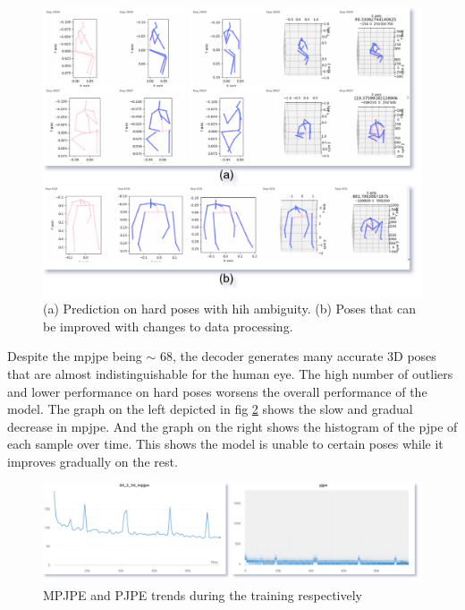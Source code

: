 \begin{figure}[h]
    \centering
    \includegraphics[scale=0.2]{figures/results/bad_samples.png}
    \caption{(a) Prediction on hard poses with hih ambiguity. (b) Poses that can be improved with changes to data processing.}
    \label{fig:bad_samples}
\end{figure}

Despite the \ac{mpjpe} being $\sim$ 68, the decoder generates many accurate 3D poses that are almost indistinguishable for the human eye. The high number of outliers and lower performance on hard poses worsens the overall performance of the model. The graph on the left depicted in fig \ref{fig:mpjpe_trends} shows the slow and gradual decrease in \ac{mpjpe}. And the graph on the right shows the histogram of the \ac{pjpe} of each sample over time. This shows the model is unable to certain poses while it improves gradually on the rest. 

\begin{figure}[h]
    \centering
    \includegraphics[scale=0.2]{figures/results/mpjpe_trend.png}
    \caption{MPJPE and PJPE trends during the training respectively}
    \label{fig:mpjpe_trends}
\end{figure}


